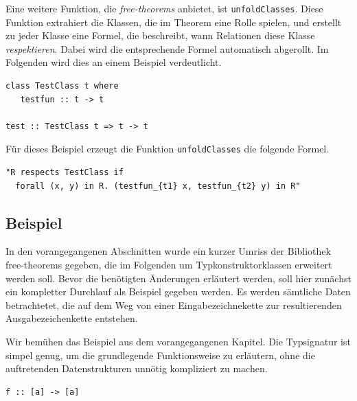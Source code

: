 Eine weitere Funktion, die \textit{free-theorems} anbietet, ist \texttt{unfoldClasses}. Diese Funktion extrahiert die Klassen,
die im Theorem eine Rolle spielen, und erstellt zu jeder Klasse eine Formel, die beschreibt, wann Relationen diese Klasse
\textit{respektieren}. Dabei wird die entsprechende Formel automatisch abgerollt. Im Folgenden wird dies an einem Beispiel
verdeutlicht.

\begin{verbatim}
class TestClass t where
   testfun :: t -> t

test :: TestClass t => t -> t
\end{verbatim}

Für dieses Beispiel erzeugt die Funktion \texttt{unfoldClasses} die folgende Formel.

\begin{verbatim}
"R respects TestClass if
  forall (x, y) in R. (testfun_{t1} x, testfun_{t2} y) in R"
\end{verbatim}

\subsection{Beispiel}

\label{sec:free-theorems-beispiel}

In den vorangegangenen Abschnitten wurde ein kurzer Umriss der Bibliothek free-theorems gegeben, die im Folgenden um
Typkonstruktorklassen erweitert werden soll. Bevor die benötigten Änderungen erläutert werden, soll hier zunächst ein
kompletter Durchlauf als Beispiel gegeben werden. Es werden sämtliche Daten betrachtetet, die auf dem Weg von einer
Eingabezeichnekette zur resultierenden Ausgabezeichenkette entstehen.


Wir bemühen das Beispiel aus dem vorangegangenen Kapitel. Die Typsignatur ist simpel genug,
um die grundlegende Funktionsweise zu erläutern, ohne die auftretenden Datenstrukturen unnötig kompliziert zu machen.

\begin{verbatim}
f :: [a] -> [a]
\end{verbatim}

